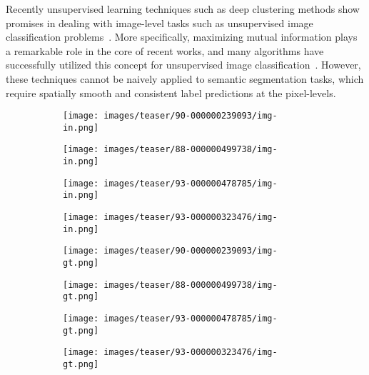 \documentclass[letterpaper, 10 pt, journal, twoside]{IEEEtran}
\begin{document}
Recently unsupervised learning techniques such as deep clustering methods show promises in dealing with image-level tasks such as unsupervised image classification problems~\cite{DEC, VaDE, InfoGAN, IMSAT, AE+CE}. More specifically, maximizing mutual information plays a remarkable role in the core of recent works, and many algorithms have successfully utilized this concept for unsupervised image classification~\cite{DEC, VaDE, InfoGAN, IMSAT, JULE, DAC}. However, these techniques cannot be naively applied to semantic segmentation tasks, which require spatially smooth and consistent label predictions at the pixel-levels.

\begin{figure}
    \centering
    \begin{subfigure}[t]{0.11\textwidth}
      \texttt{[image: images/teaser/90-000000239093/img-in.png]}
    \end{subfigure}
    \begin{subfigure}[t]{0.11\textwidth}
      \texttt{[image: images/teaser/88-000000499738/img-in.png]}
    \end{subfigure}
    \begin{subfigure}[t]{0.11\textwidth}
      \texttt{[image: images/teaser/93-000000478785/img-in.png]}
    \end{subfigure}
    \begin{subfigure}[t]{0.11\textwidth}
      \texttt{[image: images/teaser/93-000000323476/img-in.png]}
    \end{subfigure}
    
    
    \par\smallskip
    \centering
    \begin{subfigure}[t]{0.11\textwidth}
      \texttt{[image: images/teaser/90-000000239093/img-gt.png]}
    \end{subfigure}
    \begin{subfigure}[t]{0.11\textwidth}
      \texttt{[image: images/teaser/88-000000499738/img-gt.png]}
    \end{subfigure}
    \begin{subfigure}[t]{0.11\textwidth}
      \texttt{[image: images/teaser/93-000000478785/img-gt.png]}
    \end{subfigure}
    \begin{subfigure}[t]{0.11\textwidth}
      \texttt{[image: images/teaser/93-000000323476/img-gt.png]}
    \end{subfigure}
    

\end{figure}
\end{document}
